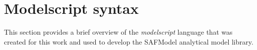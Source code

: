 \chapter{Modelscript syntax}

This section provides a brief overview of the \textit{modelscript} language that was created for this work and used to develop the SAFModel analytical model library.

\clearpage
\newpage
